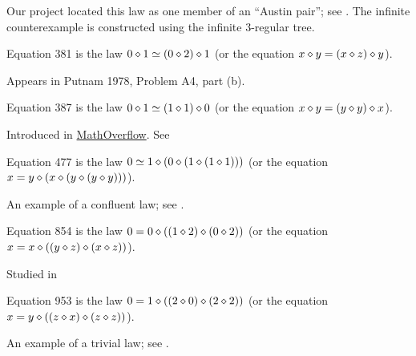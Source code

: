 Our project located this law as one member of an ``Austin pair''; see . The infinite counterexample is constructed using the infinite 3-regular tree.

\begin{definition}[Equation 381]\label{eq381}\leanok{}  Equation 381 is the law $0 \diamond 1  \simeq  (0 \diamond 2) \diamond 1$ (or the equation $x \diamond y = (x \diamond z) \diamond y$).
\end{definition}

Appears in Putnam 1978, Problem A4, part (b).

\begin{definition}[Equation 387]\label{eq387}\leanok{}  Equation 387 is the law $0 \diamond 1  \simeq  (1 \diamond 1) \diamond 0$ (or the equation $x \diamond y = (y \diamond y) \diamond x$).
\end{definition}

Introduced in \href{https://mathoverflow.net/a/450905/766}{MathOverflow}. See 

\begin{definition}[Equation 477]\label{eq477}\leanok{}  Equation 477 is the law $0 \simeq 1 \diamond (0 \diamond (1 \diamond (1 \diamond 1)))$ (or the equation $x = y \diamond (x \diamond (y \diamond (y \diamond y)))$).
\end{definition}

An example of a confluent law; see .

\begin{definition}[Equation 854]\label{eq854}\leanok{}  Equation 854 is the law $0 = 0 \diamond ((1 \diamond 2) \diamond (0 \diamond 2))$ (or the equation $x = x \diamond ((y \diamond z) \diamond (x \diamond z))$).
\end{definition}

Studied in 


\begin{definition}[Equation 953]\label{eq953}\leanok{}  Equation 953 is the law $0 = 1 \diamond ((2 \diamond 0) \diamond (2 \diamond 2))$ (or the equation $x = y \diamond ((z \diamond x) \diamond (z \diamond z))$).
\end{definition}

An example of a trivial law; see .

